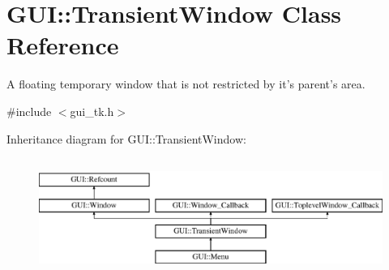 \hypertarget{classGUI_1_1TransientWindow}{\section{G\-U\-I\-:\-:Transient\-Window Class Reference}
\label{classGUI_1_1TransientWindow}
}


A floating temporary window that is not restricted by it's parent's area.  




{\ttfamily \#include $<$gui\-\_\-tk.\-h$>$}

Inheritance diagram for G\-U\-I\-:\-:Transient\-Window\-:\begin{figure}[H]
\begin{center}
\leavevmode
\includegraphics[height=3.848797cm]{classGUI_1_1TransientWindow}
\end{center}
\end{figure}
